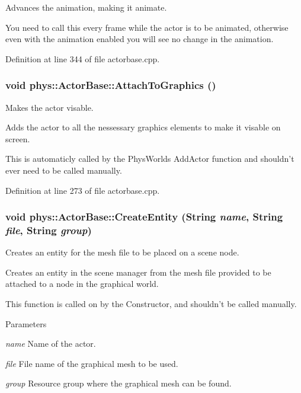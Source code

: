 Advances the animation, making it animate. 

You need to call this every frame while the actor is to be animated, otherwise even with the animation enabled you will see no change in the animation. 

Definition at line 344 of file actorbase.cpp.

\hypertarget{classphys_1_1ActorBase_a45f190cb9b647bb3385d1298f9dab589}{
\subsubsection[{AttachToGraphics}]{\setlength{\rightskip}{0pt plus 5cm}void phys::ActorBase::AttachToGraphics ()}}
\label{d8/d0f/classphys_1_1ActorBase_a45f190cb9b647bb3385d1298f9dab589}


Makes the actor visable. 

Adds the actor to all the nessessary graphics elements to make it visable on screen. \par
 This is automaticly called by the PhysWorlds AddActor function and shouldn't ever need to be called manually. 

Definition at line 273 of file actorbase.cpp.

\hypertarget{classphys_1_1ActorBase_aff7dbb190fb982a43123bee3066501c4}{
\subsubsection[{CreateEntity}]{\setlength{\rightskip}{0pt plus 5cm}void phys::ActorBase::CreateEntity ({\bf String} {\em name}, \/  {\bf String} {\em file}, \/  {\bf String} {\em group})}}
\label{d8/d0f/classphys_1_1ActorBase_aff7dbb190fb982a43123bee3066501c4}


Creates an entity for the mesh file to be placed on a scene node. 

Creates an entity in the scene manager from the mesh file provided to be attached to a node in the graphical world. \par
 This function is called on by the Constructor, and shouldn't be called manually. 
\begin{DoxyParams}{Parameters}
\item[{\em name}]Name of the actor. \item[{\em file}]File name of the graphical mesh to be used. \item[{\em group}]Resource group where the graphical mesh can be found. \end{DoxyParams}


